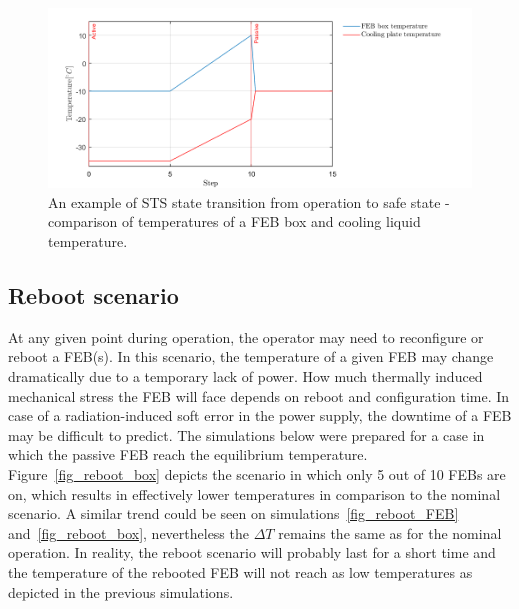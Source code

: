 \begin{figure}[!h]
\centering
\includegraphics[width=0.95\columnwidth]{Chapter4/images/nominal_all.png}
\caption{An example of \gls{STS} state transition from operation to safe state - comparison of temperatures of a \gls{FEB} box and cooling liquid temperature.}
\label{fig_nominal_scenario}
\end{figure}

\subsection{Reboot scenario}
\label{reboot}
At any given point during operation, the operator may need to reconfigure or reboot a \gls{FEB}(s). In this scenario, the temperature of a given \gls{FEB} may change dramatically due to a temporary lack of power. How much thermally induced mechanical stress the \gls{FEB} will face depends on reboot and configuration time. In case of a radiation-induced soft error in the power supply, the downtime of a \gls{FEB} may be difficult to predict. The simulations below were prepared for a case in which the passive \gls{FEB} reach the equilibrium temperature. Figure~\ref{fig_reboot_box} depicts the scenario in which only 5 out of 10 \glspl{FEB} are on, which results in effectively lower temperatures in comparison to the nominal scenario. A similar trend could be seen on simulations~\ref{fig_reboot_FEB} and~\ref{fig_reboot_box}, nevertheless the $\Delta T$ remains the same as for the nominal operation. In reality, the reboot scenario will probably last for a short time and the temperature of the rebooted \gls{FEB} will not reach as low temperatures as depicted in the previous simulations.



